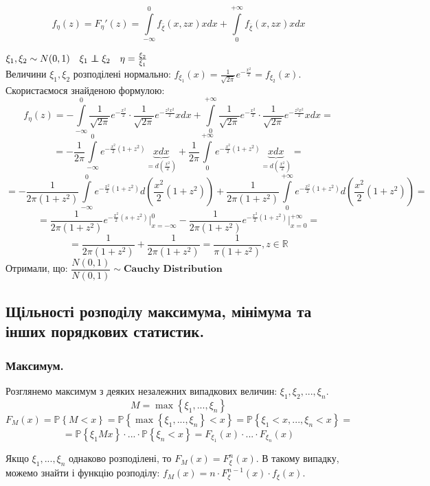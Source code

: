 $$
f_{\eta}(z) = F_{\eta}'(z) =  \int\limits_{-\infty}^{ 0}{ f_{\overline{\xi}}(x,zx)x dx} +  \int\limits_{0}^{ +\infty}{f_{\overline{\xi}}(x, zx) x dx}
$$
\begin{example}
    $\xi_1, \xi_2 \sim N(0,1) \quad \xi_1 \independent \xi_2 \quad \eta = \frac{\xi_2}{\xi_1} $
\\ Величини $\xi_1, \xi_2$ розподілені нормально: $
f_{\xi_1} (x) = \frac{1}{\sqrt{2 \pi}} e^{ - \frac{x^2}{2} }  = f_{\xi_2 } (x).
$\\
Скористаємося знайденою формулою:
$$
f_{\eta} (z) = -  \int\limits_{-\infty}^{ 0}{\frac{1}{\sqrt{2 \pi}} e^{ - \frac{x^2}{2} } \cdot \frac{1}{\sqrt{2 \pi}} e^{ - \frac{z^2x^2}{2} } } x dx + \int\limits_{0}^{ +\infty}{\frac{1}{\sqrt{2 \pi}} e^{ - \frac{x^2}{2} } \cdot \frac{1}{\sqrt{2 \pi}} e^{ - \frac{z^2x^2}{2} } } x dx  =
$$
$$
= - \frac{1}{2\pi}  \int\limits_{-\infty}^{0}{ e^{ -\frac{x^2}{2}(1+z^2) }} \underbrace{xdx}_{= d \left( \frac{x^2}{2}  \right)}  + \frac{1}{2\pi}  \int\limits_{0}^{+ \infty}{ e^{ -\frac{x^2}{2}(1+z^2) }} \underbrace{xdx}_{= d \left( \frac{x^2}{2}  \right)} =
$$
$$
= - \frac{1 }{2 \pi ( 1 + z^2)}  \int\limits_{-\infty}^{0}{ e^{- \frac{x^2}{2}(1+z^2) } d \left( \frac{x^2}{2}(1+z^2) \right) }  + \frac{1 }{2 \pi ( 1 + z^2)}  \int\limits_{0}^{+ \infty}{ e^{- \frac{x^2}{2}(1+z^2) } d \left( \frac{x^2}{2}(1+z^2) \right) } =
$$
$$
= \frac{1 }{2 \pi ( 1 + z^2)}   e^{- \frac{x^2}{2}(s+z^2) } \Bigg|_{x = -\infty}^{0}  - \frac{1 }{2 \pi ( 1 + z^2)}   e^{- \frac{x^2}{2}(1+z^2) } \Bigg|_{x = 0}^{+\infty} =
$$
$$
 =\frac{1}{2\pi (1+ z^2)} +  \frac{1}{2\pi (1+ z^2)} = \frac{1}{\pi (1+ z^2)} , z \in \mathbb{R}
$$
Отримали, що: $ \dfrac{N(0,1)}{N(0,1)} \sim \textbf{Cauchy Distribution} $
\end{example}

\subsection{Щільності розподілу максимума, мінімума та інших порядкових статистик.}
\subsubsection{Максимум.}
Розглянемо максимум з деяких незалежних випадкових величин: $ \xi_1 , \xi_2, ... , \xi_n$.
$$M = \max \left\lbrace \xi_1, ..., \xi_n \right\rbrace $$
$$
F_M (x) =  \mathbb{P} \left\lbrace M < x \right\rbrace = \mathbb{P} \left\lbrace \max \left\lbrace \xi_1, ... , \xi_n \right\rbrace < x  \right\rbrace  = \mathbb{P} \left\lbrace \xi_1 < x, ... , \xi_n < x \right\rbrace =
$$
$$
= \mathbb{P} \left\lbrace \xi_1 M x \right\rbrace \cdot ... \cdot \mathbb{P} \left\lbrace  \xi_n < x \right\rbrace = F_{\xi_1} (x ) \cdot ... \cdot F_{\xi_n} (x)
$$
\begin{center}
\end{center}
Якщо $\xi_1 , ..., \xi_n$ однаково розподілені, то $ F_M (x) = F^n_{\xi} (x)$. В такому випадку, можемо знайти і функцію розподілу: $ f_M (x) = n \cdot F_{\xi}^{n-1} (x) \cdot f_{\xi }(x)$.

